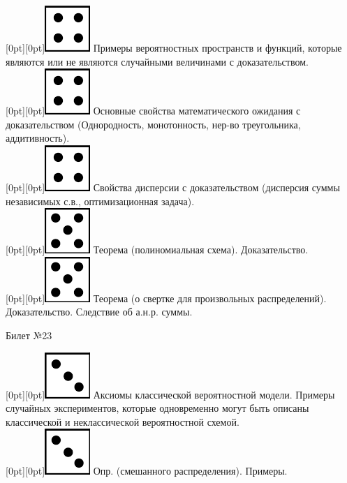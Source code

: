 \documentclass[10pt]{article}
\begin{document}
\raisebox{-1pt}[0pt][0pt]{\includegraphics[width=0.02\linewidth]{4.png}} Примеры вероятностных пространств и функций, которые являются или не являются случайными величинами с доказательством. \\

\raisebox{-1pt}[0pt][0pt]{\includegraphics[width=0.02\linewidth]{4.png}} Основные свойства математического ожидания с доказательством (Однородность, монотонность, нер-во треугольника, аддитивность). \\

\raisebox{-1pt}[0pt][0pt]{\includegraphics[width=0.02\linewidth]{4.png}} Свойства дисперсии с доказательством (дисперсия суммы независимых с.в., оптимизационная задача). \\ 

\raisebox{-1pt}[0pt][0pt]{\includegraphics[width=0.02\linewidth]{5.png}} Теорема (полиномиальная схема). Доказательство. \\

\raisebox{-1pt}[0pt][0pt]{\includegraphics[width=0.02\linewidth]{5.png}} Теорема (о свертке для произвольных распределений). Доказательство. Следствие об а.н.р. суммы. \\ 

\begin{center} {\Large Билет №23} \end{center} 

\raisebox{-1pt}[0pt][0pt]{\includegraphics[width=0.02\linewidth]{3.png}} Аксиомы классической вероятностной модели. Примеры случайных экспериментов, которые одновременно могут быть описаны классической и неклассической вероятностной схемой. \\

\raisebox{-1pt}[0pt][0pt]{\includegraphics[width=0.02\linewidth]{3.png}} Опр. (смешанного распределения). Примеры. \\
\end{document}
